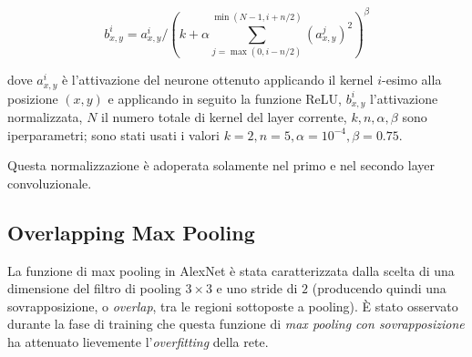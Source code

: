 \[b_{x,y}^{i}=a_{x,y}^{i}/\left(k+\alpha \sum_{j=\max(0,i-n/2)}^{\min(N-1,i+n/2)}(a_{x,y}^{j})^{2}\right)^{\beta}\]

dove $a_{x,y}^{i}$ è l'attivazione del neurone ottenuto applicando il kernel $i$-esimo alla posizione $(x,y)$ e applicando in seguito la funzione ReLU, $b_{x,y}^{i}$ l'attivazione normalizzata, $N$ il numero totale di kernel del layer corrente, $k, n, \alpha, \beta$ sono iperparametri; sono stati usati i valori $k=2, n=5, \alpha=10^{-4}, \beta=0.75$.

Questa normalizzazione è adoperata solamente nel primo e nel secondo layer convoluzionale.

\subsection{Overlapping Max Pooling}
La funzione di max pooling in AlexNet è stata caratterizzata dalla scelta di una dimensione del filtro di pooling $3\times 3$ e uno stride di $2$ (producendo quindi una sovrapposizione, o \textit{overlap}, tra le regioni sottoposte a pooling). È stato osservato durante la fase di training che questa funzione di \textit{max pooling con sovrapposizione} ha attenuato lievemente l'\textit{overfitting} della rete.

